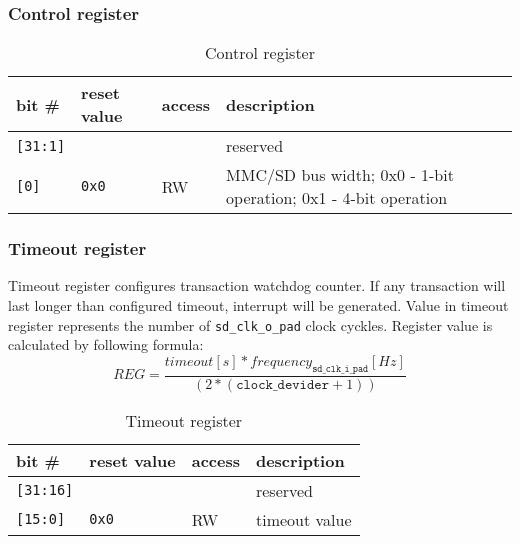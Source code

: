     \subsubsection{Control register}
    \label{sec:control_reg}
    
    \begin{table}[H]
    \caption{Control register}
        \begin{tabular}{m{1.3cm}|m{2cm}|m{1cm}|m{8cm}}
                \rowcolor[gray]{0.7} bit \# & reset value & access & description \\ \hline \hline
                \texttt{[31:1]} & & & reserved \\ \hline
                \texttt{[0]} & \texttt{0x0} & RW & MMC/SD bus width; 0x0 - 1-bit operation; 0x1 - 4-bit operation \\ \hline
                \hline
        \end{tabular}
        \label{tab:control_reg}
    \end{table}
    
    \subsubsection{Timeout register}
    \label{sec:timeout_reg}
    
    Timeout register configures transaction watchdog counter. If any transaction will last longer than configured timeout, interrupt will be generated.
    Value in timeout register represents the number of \texttt{sd\_clk\_o\_pad} clock cyckles. Register value is calculated by following formula:
    \begin{equation}
    REG = \frac{timeout[s] * frequency_{\texttt{sd\_clk\_i\_pad}}[Hz]}{(2*(\texttt{clock\_devider} + 1))}
    \end{equation} 
    
    \begin{table}[H]
    \caption{Timeout register}
        \begin{tabular}{m{1.3cm}|m{2cm}|m{1cm}|m{8cm}}
                \rowcolor[gray]{0.7} bit \# & reset value & access & description \\ \hline \hline
                \texttt{[31:16]} & & & reserved \\ \hline
                \texttt{[15:0]} & \texttt{0x0} & RW & timeout value \\ \hline
                \hline
        \end{tabular}
        \label{tab:timeout_reg}
    \end{table}
    
